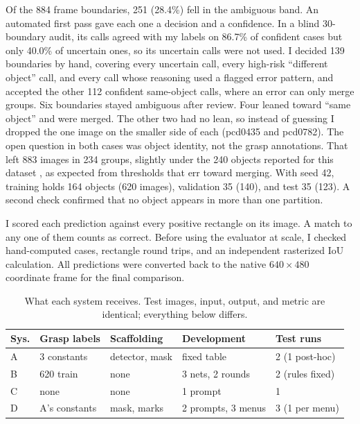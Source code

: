 \documentclass[10pt,conference,compsoc]{IEEEtran}
\begin{document}
Of the 884 frame boundaries, 251 (28.4\%) fell in the ambiguous band. An
automated first pass gave each one a decision and a confidence. In a blind
30-boundary audit, its calls agreed with my labels on 86.7\% of confident
cases but only 40.0\% of uncertain ones, so its uncertain calls were not
used. I decided 139 boundaries by hand, covering every uncertain call, every
high-risk ``different object'' call, and every call whose reasoning used a
flagged error pattern, and accepted the other 112
confident same-object calls, where an error can only merge groups. Six
boundaries stayed ambiguous after review. Four leaned toward ``same object''
and were merged. The other two had no lean, so instead of guessing I dropped
the one image on the smaller side of each (pcd0435 and pcd0782). The open
question in both cases was object identity, not the grasp annotations. That
left 883 images in 234 groups, slightly under the 240 objects reported for this dataset
\cite{redmon2015}, as expected from thresholds that err toward merging. With
seed 42, training holds 164 objects (620 images), validation 35 (140), and
test 35 (123). A second check confirmed that no object appears in more than
one partition.

I scored each prediction against every positive rectangle on its image. A
match to any one of them counts as correct. Before using the evaluator at
scale, I checked hand-computed cases, rectangle round trips, and an independent
rasterized IoU calculation. All predictions were converted back to the native
$640\times480$ coordinate frame for the final comparison.

\begin{table}[t]
\caption{What each system receives. Test images, input, output, and metric
are identical; everything below differs.}
\label{tab:inputs}
\centering
\footnotesize
\setlength{\tabcolsep}{3pt}
\begin{tabular}{@{}lllll@{}}
\toprule
Sys. & Grasp labels & Scaffolding & Development & Test runs \\
\midrule
A & 3 constants & detector, mask & fixed table & 2 (1 post-hoc) \\
B & 620 train & none & 3 nets, 2 rounds & 2 (rules fixed) \\
C & none & none & 1 prompt & 1 \\
D & A's constants & mask, marks & 2 prompts, 3 menus & 3 (1 per menu) \\
\bottomrule
\end{tabular}
\end{table}
\end{document}
